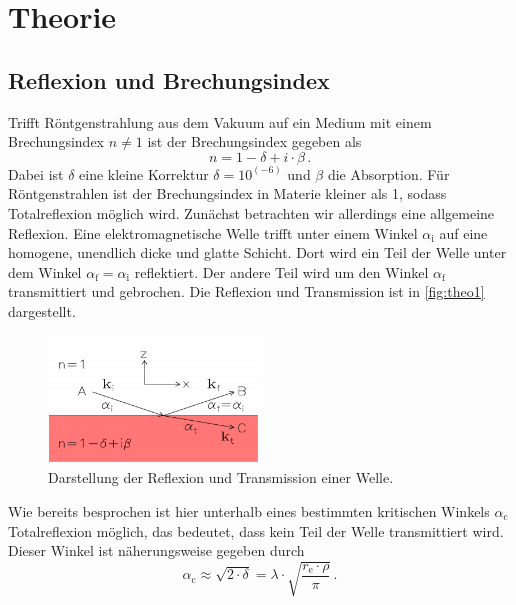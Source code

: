 \section{Theorie}
\label{sec:Theorie}

\subsection{Reflexion und Brechungsindex}
\label{theo1}

Trifft Röntgenstrahlung aus dem Vakuum auf ein Medium mit einem Brechungsindex $n \neq 1$ ist der Brechungsindex gegeben als
\begin{equation}
    n = 1 −  \delta + i \cdot \beta \,.
    \label{eq:index}
\end{equation}
Dabei ist $\delta$ eine kleine Korrektur $\delta = 10^{(-6)}$ und $\beta$ die Absorption.
Für Röntgenstrahlen ist der Brechungsindex in Materie kleiner als 1, sodass Totalreflexion möglich wird.
Zunächst betrachten wir allerdings eine allgemeine Reflexion.
Eine elektromagnetische Welle trifft unter einem Winkel $\alpha_\text{i}$ auf eine homogene, unendlich dicke und glatte Schicht.
Dort wird ein Teil der Welle unter dem Winkel $\alpha _\text{f} = \alpha _\text{i}$ reflektiert.
Der andere Teil wird um den Winkel $\alpha _\text{f}$ transmittiert und gebrochen.
Die Reflexion und Transmission ist in \autoref{fig:theo1} dargestellt.

\begin{figure}
    \centering
    \includegraphics[width=0.5\textwidth]{images/reflektion.png}
    \caption{Darstellung der Reflexion und Transmission einer Welle. \cite{V44old}}
    \label{fig:theo1}
\end{figure}

Wie bereits besprochen ist hier unterhalb eines bestimmten kritischen Winkels $\alpha _\text{c}$ Totalreflexion möglich, das bedeutet, dass kein Teil der Welle transmittiert wird.
Dieser Winkel ist näherungsweise gegeben durch
\begin{equation}
    \alpha _\text{c} \approx \sqrt{2 \cdot \delta} = \lambda  \cdot \sqrt{\frac{r_\text{e} \cdot \rho}{\pi}} \, .
    \label{eq:a_c}
\end{equation}

